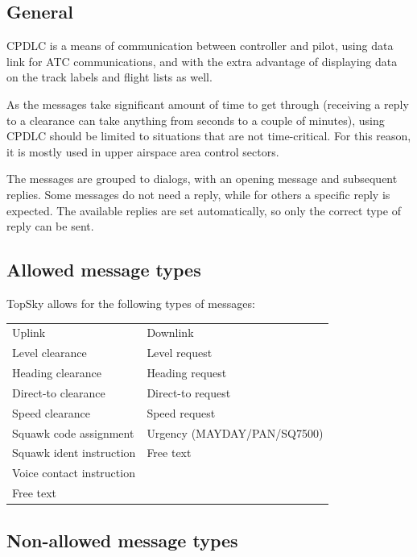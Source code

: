 \documentclass[11pt,a4paper]{memoir}
\begin{document}
\subsection{General}
\label{cpdlc:gen}

CPDLC is a means of communication between controller and pilot, using data link for ATC communications, and with the extra advantage of displaying data on the track labels and flight lists as well.

As the messages take significant amount of time to get through (receiving a reply to a clearance can take anything from seconds to a couple of minutes), using CPDLC should be limited to situations that are not time-critical. For this reason, it is mostly used in upper airspace area control sectors.

The messages are grouped to dialogs, with an opening message and subsequent replies. Some messages do not need a reply, while for others a specific reply is expected. The available replies are set automatically, so only the correct type of reply can be sent.

\subsection{Allowed message types}
\label{cpdlc:amt}

TopSky allows for the following types of messages:

\begin{tabular}{l l}
  Uplink                      & Downlink\\
  Level clearance             & Level request\\
  Heading clearance           & Heading request\\
  Direct-to clearance         & Direct-to request\\
  Speed clearance             & Speed request\\
  Squawk code assignment      & Urgency (MAYDAY/PAN/SQ7500)\\
  Squawk ident instruction    & Free text\\
  Voice contact instruction   & \\
  Free text                   & \\
\end{tabular}

\subsection{Non-allowed message types}
\label{cpdlc:nmt}
\end{document}
